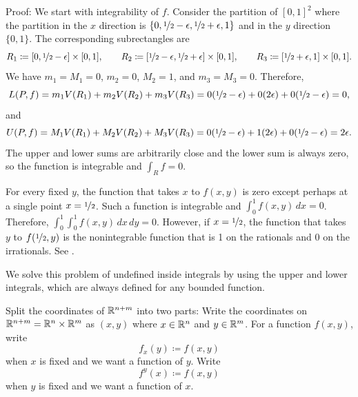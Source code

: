 \begin{example}
Proof:
We start with integrability of $f$.  Consider the partition
of $[0,1]^2$ where the partition in the $x$ direction is
$\{ 0, \nicefrac{1}{2}-\epsilon,
\nicefrac{1}{2}+\epsilon,1\}$ and in the $y$ direction $\{ 0, 1 \}$.
The corresponding subrectangles are
\begin{equation*}
R_1 \coloneqq [0, \nicefrac{1}{2}-\epsilon] \times [0,1],
\qquad
R_2 \coloneqq [\nicefrac{1}{2}-\epsilon,
\nicefrac{1}{2}+\epsilon] \times [0,1],
\qquad
R_3 \coloneqq [\nicefrac{1}{2}+\epsilon,1] \times [0,1] .
\end{equation*}
We have $m_1 = M_1 = 0$, $m_2 =0$, $M_2 = 1$, and $m_3 = M_3 = 0$.
Therefore,
\begin{equation*}
L(P,f) = 
m_1 V(R_1)
+
m_2 V(R_2)
+
m_3 V(R_3)
=
0 (\nicefrac{1}{2}-\epsilon)
+
0 (2\epsilon)
+
0 (\nicefrac{1}{2}-\epsilon) = 0 ,
\end{equation*}
and
\begin{equation*}
U(P,f) = 
M_1 V(R_1)
+
M_2 V(R_2)
+
M_3 V(R_3)
=
0 (\nicefrac{1}{2}-\epsilon)
+
1 (2\epsilon)
+
0 (\nicefrac{1}{2}-\epsilon) = 2 \epsilon .
\end{equation*}
The upper and lower sums are arbitrarily close and the lower sum is always
zero, so the function is integrable and $\int_R f = 0$.

For every fixed $y$, the function that takes $x$ to $f(x,y)$ is zero except
perhaps at a single point $x=\nicefrac{1}{2}$.  Such a
function is integrable and $\int_0^1 f(x,y) \, dx = 0$.  Therefore,
$\int_0^1 \int_0^1 f(x,y) \, dx \, dy = 0$.
However, if $x=\nicefrac{1}{2}$, the function that takes $y$ to
$f(\nicefrac{1}{2},y)$ is the nonintegrable function that is
1 on the rationals and 0 on the irrationals.
See .
\end{example}

We solve this problem of undefined inside integrals
by using the upper and lower integrals, which are always defined
for any bounded function.

\medskip

Split the coordinates of ${\mathbb{R}}^{n+m}$ into two parts:
Write the coordinates on ${\mathbb{R}}^{n+m} = {\mathbb{R}}^n \times {\mathbb{R}}^m$ as
$(x,y)$ where $x \in {\mathbb{R}}^n$ and $y \in {\mathbb{R}}^m$.  For a function $f(x,y)$,
write
\begin{equation*}
f_x(y) \coloneqq f(x,y)
\end{equation*}
when $x$ is fixed and we want a function of $y$.
Write
\begin{equation*}
f^y(x) \coloneqq f(x,y)
\end{equation*}
when $y$ is fixed and we want a function of $x$.

